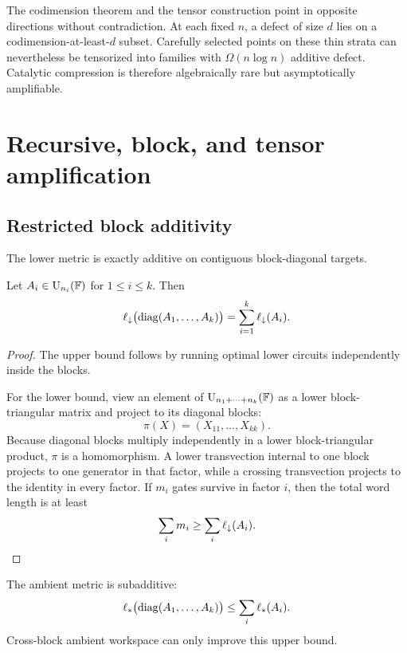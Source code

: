 \begin{remark}\label{rem:rare-amplifiable}
The codimension theorem and the tensor construction point in opposite directions without contradiction.  At each fixed $n$, a defect of size $d$ lies on a codimension-at-least-$d$ subset.  Carefully selected points on these thin strata can nevertheless be tensorized into families with $\Omega(n\log n)$ additive defect.  Catalytic compression is therefore algebraically rare but asymptotically amplifiable.
\end{remark}

\section{Recursive, block, and tensor amplification}\label{sec:amplification}

\subsection{Restricted block additivity}

The lower metric is exactly additive on contiguous block-diagonal targets.

\begin{proposition}\label{prop:block-additivity}
Let $A_i\in\operatorname{U}_{n_i}(\mathbb F)$ for $1\le i\le k$.  Then
\[
\ell_{\downarrow}\bigl(\operatorname{diag}(A_1,\ldots,A_k)\bigr)
=
\sum_{i=1}^k\ell_{\downarrow}(A_i).
\]
\end{proposition}

\begin{proof}
The upper bound follows by running optimal lower circuits independently inside the blocks.

For the lower bound, view an element of $\operatorname{U}_{n_1+\cdots+n_k}(\mathbb F)$ as a lower block-triangular matrix and project to its diagonal blocks:
\[
\pi(X)=(X_{11},\ldots,X_{kk}).
\]
Because diagonal blocks multiply independently in a lower block-triangular product, $\pi$ is a homomorphism.  A lower transvection internal to one block projects to one generator in that factor, while a crossing transvection projects to the identity in every factor.  If $m_i$ gates survive in factor $i$, then the total word length is at least
\[
\sum_i m_i
\ge
\sum_i\ell_{\downarrow}(A_i).
\]
\end{proof}

The ambient metric is subadditive:
\[
\ell_{*}\bigl(\operatorname{diag}(A_1,\ldots,A_k)\bigr)
\le
\sum_i\ell_{*}(A_i).
\]
Cross-block ambient workspace can only improve this upper bound.

